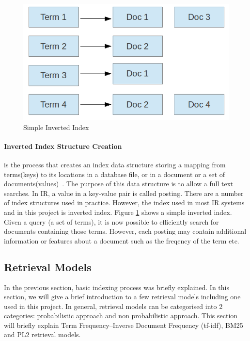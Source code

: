 \begin{figure}
\centering
\includegraphics[scale=0.5]{./figures/invertedIndex.png}
\caption{Simple Inverted Index} \label{fig:invertedIndex} 
\end{figure}

\paragraph{Inverted Index Structure Creation} is the process that creates an index data structure storing a mapping from terms(keys) to its 
locations in a database file, or in a document or a set of documents(values)~\cite{invertedindex}. 
The purpose of this data structure is to allow a full text searches. In IR, a value in a key-value pair is called posting. There are a number of index
structures used in practice. However, the index used in most IR systems and in this project is inverted index.
Figure \ref{fig:invertedIndex} shows a simple inverted index. Given a query (a set of terms), it is now possible to efficiently search for
documents containing those terms. However, each posting may contain additional information or features
about a document such as the freqency of the term etc.

\subsection{Retrieval Models}\label{section:retrievalmodel}
In the previous section, basic indexing process was briefly explained. In this section, we will give a brief introduction to a few retrieval models including one
used in this project. In general, retrieval models can be categorised into 2 categories: probabilistic approach and non probabilistic approach.
This section will briefly explain Term Frequency–Inverse Document Frequency (tf-idf), BM25 and PL2 retrieval models.

